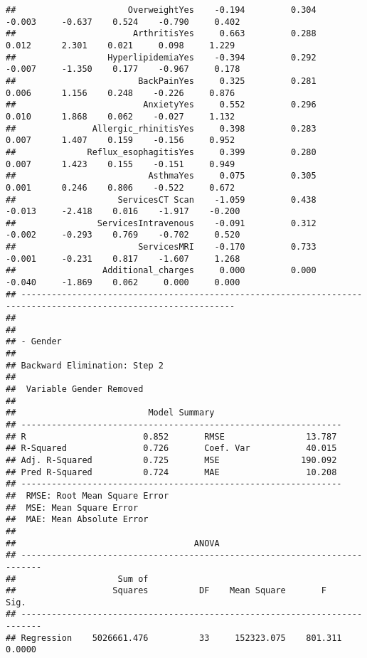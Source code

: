 \documentclass[
]{article}
\begin{document}
\begin{verbatim}
##                      OverweightYes    -0.194         0.304       -0.003     -0.637    0.524    -0.790     0.402 
##                       ArthritisYes     0.663         0.288        0.012      2.301    0.021     0.098     1.229 
##                  HyperlipidemiaYes    -0.394         0.292       -0.007     -1.350    0.177    -0.967     0.178 
##                        BackPainYes     0.325         0.281        0.006      1.156    0.248    -0.226     0.876 
##                         AnxietyYes     0.552         0.296        0.010      1.868    0.062    -0.027     1.132 
##               Allergic_rhinitisYes     0.398         0.283        0.007      1.407    0.159    -0.156     0.952 
##              Reflux_esophagitisYes     0.399         0.280        0.007      1.423    0.155    -0.151     0.949 
##                          AsthmaYes     0.075         0.305        0.001      0.246    0.806    -0.522     0.672 
##                    ServicesCT Scan    -1.059         0.438       -0.013     -2.418    0.016    -1.917    -0.200 
##                ServicesIntravenous    -0.091         0.312       -0.002     -0.293    0.769    -0.702     0.520 
##                        ServicesMRI    -0.170         0.733       -0.001     -0.231    0.817    -1.607     1.268 
##                 Additional_charges     0.000         0.000       -0.040     -1.869    0.062     0.000     0.000 
## ----------------------------------------------------------------------------------------------------------------
## 
## 
## - Gender 
## 
## Backward Elimination: Step 2 
## 
##  Variable Gender Removed 
## 
##                          Model Summary                          
## ---------------------------------------------------------------
## R                       0.852       RMSE                13.787 
## R-Squared               0.726       Coef. Var           40.015 
## Adj. R-Squared          0.725       MSE                190.092 
## Pred R-Squared          0.724       MAE                 10.208 
## ---------------------------------------------------------------
##  RMSE: Root Mean Square Error 
##  MSE: Mean Square Error 
##  MAE: Mean Absolute Error 
## 
##                                   ANOVA                                    
## --------------------------------------------------------------------------
##                    Sum of                                                 
##                   Squares          DF    Mean Square       F         Sig. 
## --------------------------------------------------------------------------
## Regression    5026661.476          33     152323.075    801.311    0.0000 

\end{verbatim}
\end{document}
